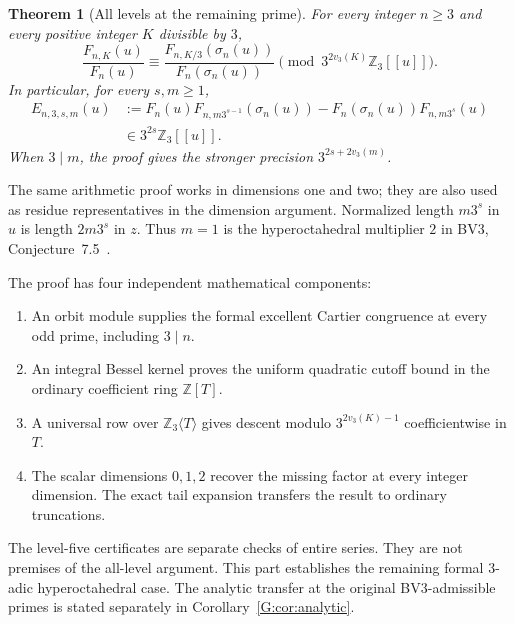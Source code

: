 \documentclass[11pt,a4paper]{article}
\newtheorem{theorem}{Theorem}[section]
\theoremstyle{definition}\newtheorem{definition}[theorem]{Definition}
\theoremstyle{remark}\newtheorem{remark}[theorem]{Remark}
\numberwithin{equation}{section}
\begin{document}
\begin{theorem}[All levels at the remaining prime]\label{AP:thm:main}
For every integer $n\ge3$ and every positive integer $K$ divisible by $3$,
\[
 \frac{F_{n,K}(u)}{F_n(u)}
 \equiv
 \frac{F_{n,K/3}(\sigma_n(u))}{F_n(\sigma_n(u))}
       \pmod{3^{2v_3(K)}\mathbb Z_3[[u]]}.
\]
In particular, for every $s,m\ge1$,
\begin{align*}
 E_{n,3,s,m}(u)
 &:=F_n(u)F_{n,m3^{s-1}}(\sigma_n(u))
       -F_n(\sigma_n(u))F_{n,m3^s}(u)\\
 &\in3^{2s}\mathbb Z_3[[u]].
\end{align*}
When $3\mid m$, the proof gives the stronger precision
$3^{2s+2v_3(m)}$.
\end{theorem}

The same arithmetic proof works in dimensions one and two; they are
also used as residue representatives in the dimension argument.
Normalized length $m3^s$ in $u$ is length $2m3^s$ in $z$.
Thus $m=1$ is the hyperoctahedral multiplier $2$ in
BV3, Conjecture~7.5~\cite{BV3}.

The proof has four independent mathematical components:
\begin{enumerate}
\item An orbit module supplies the formal excellent Cartier congruence
at every odd prime, including $3\mid n$.
\item An integral Bessel kernel proves the uniform quadratic cutoff
bound in the ordinary coefficient ring $\mathbb Z[T]$.
\item A universal row over $\mathbb Z_3\langle T\rangle$ gives
descent modulo $3^{2v_3(K)-1}$ coefficientwise in $T$.
\item The scalar dimensions $0,1,2$ recover the missing factor at
every integer dimension.  The exact tail expansion transfers the
result to ordinary truncations.
\end{enumerate}
The level-five certificates are separate checks of entire series.
They are not premises of the all-level argument.  This part
establishes the remaining formal $3$-adic hyperoctahedral case. The
analytic transfer at the original BV3-admissible primes is stated
separately in Corollary~\ref{G:cor:analytic}.
\end{document}
